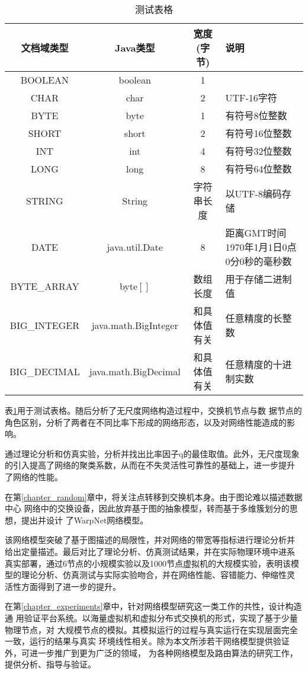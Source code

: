 \documentclass[master]{njuthesis}
\begin{document}
\begin{table}
  \centering
  \begin{tabular}{cccp{38mm}}
    \toprule
    \textbf{文档域类型} & \textbf{Java类型} & \textbf{宽度(字节)} & \textbf{说明} \\
    \midrule
    BOOLEAN  & boolean &  1  & \\
    CHAR     & char    &  2  & UTF-16字符 \\
    BYTE     & byte    &  1  & 有符号8位整数 \\
    SHORT    & short   &  2  & 有符号16位整数 \\
    INT      & int     &  4  & 有符号32位整数 \\
    LONG     & long    &  8  & 有符号64位整数 \\
    STRING   & String  &  字符串长度  & 以UTF-8编码存储 \\
    DATE     & java.util.Date & 8 & 距离GMT时间1970年1月1日0点0分0秒的毫秒数 \\
    BYTE\_ARRAY & byte$[]$ & 数组长度 & 用于存储二进制值 \\
    BIG\_INTEGER & java.math.BigInteger & 和具体值有关 & 任意精度的长整数 \\
    BIG\_DECIMAL & java.math.BigDecimal & 和具体值有关 & 任意精度的十进制实数 \\
    \bottomrule
  \end{tabular}
  \caption{测试表格}\label{table:test5}
\end{table}

表\ref{table:test5}用于测试表格。随后分析了无尺度网络构造过程中，交换机节点与数
据节点的角色区别，分析了两者在不同比率下形成的网络形态，以及对网络性能造成的影响。

通过理论分析和仿真实验，分析并找出比率因子q的最佳取值。此外，无尺度现象
的引入提高了网络的聚类系数，从而在不失灵活性可靠性的基础上，进一步提升
了网络的性能。

在第\ref{chapter_random}章中，将关注点转移到交换机本身。由于图论难以描述数据中心
网络中的交换设备，因此放弃基于图的抽象模型，转而基于多维簇划分的思想，提出并设计
了WarpNet网络模型。

该网络模型突破了基于图描述的局限性，并对网络的带宽等指标进行理论分析并
给出定量描述。最后对比了理论分析、仿真测试结果，并在实际物理环境中进系
真实部署，通过6节点的小规模实验以及1000节点虚拟机的大规模实验，表明该模
型的理论分析、仿真测试与实际实验吻合，并在网络性能、容错能力、伸缩性灵
活性方面得到了进一步的提升。

在第\ref{chapter_experiments}章中，针对网络模型研究这一类工作的共性，设计构造通
用验证平台系统。以海量虚拟机和虚拟分布式交换机的形式，实现了基于少量物理节点，对
大规模节点的模拟。其模拟运行的过程与真实运行在实现层面完全一致，运行的结果与真实
环境线性相关。除为本文所涉若干网络模型提供验证外，可进一步推广到更为广泛的领域，
为各种网络模型及路由算法的研究工作，提供分析、指导与验证。
\end{document}
